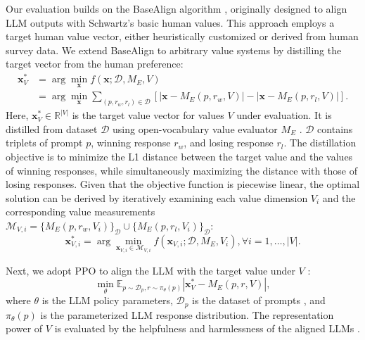 Our evaluation builds on the BaseAlign algorithm \cite{yao2023value_fulcra}, originally designed to align LLM outputs with Schwartz's basic human values. This approach employs a target human value vector, either heuristically customized or derived from human survey data. We extend BaseAlign to arbitrary value systems by distilling the target vector from the human preference:
\begin{equation}
  \begin{aligned}
  \mathbf{x}_{V}^{*} & = \arg\min_{\mathbf{x}} f(\mathbf{x}; \mathcal{D}, M_E, V) \\
  & = \arg\min_{\mathbf{x}} \sum_{(p, r_w, r_l) \in \mathcal{D}} \left[\left| \mathbf{x} - M_E(p, r_w, V)\right| - \left| \mathbf{x} - M_E(p, r_l, V ) \right| \right].
  \end{aligned}
\end{equation}
Here, $\mathbf{x}_{V}^{*} \in \mathbb{R}^{|V|}$ is the target value vector for values $V$ under evaluation. It is distilled from dataset $\mathcal{D}$ \cite{ouyang2022training} using open-vocabulary value evaluator $M_E$ \cite{ye2025gpv}. $\mathcal{D}$ contains triplets of prompt $p$, winning response $r_w$, and losing response $r_l$. 
The distillation objective is to minimize the L1 distance between the target value and the values of winning responses, while simultaneously maximizing the distance with those of losing responses. Given that the objective function is piecewise linear, the optimal solution can be derived by iteratively examining each value dimension \( V_i \) and the corresponding value measurements \( \mathcal{M}_{V, i} = \{M_E(p, r_w, V_i)\}_\mathcal{D} \cup \{M_E(p, r_l, V_i)\}_\mathcal{D} \):
\begin{equation}
  \mathbf{x}_{V, i}^{*} = \arg\min_{\mathbf{x}_{V, i} \in \mathcal{M}_{V, i}} f(\mathbf{x}_{V, i}; \mathcal{D}, M_E, V_i), 
  \forall i = 1, \ldots, |V|.
\end{equation}

Next, we adopt PPO \cite{schulman2017proximal} to align the LLM with the target value under \( V \) \cite{yao2023value_fulcra}:
\begin{equation}
  \min_{\theta} \mathbb{E}_{p \sim \mathcal{D}_p, r \sim \pi_{\theta}(p)}
  \left|   
  \mathbf{x}_{V}^{*} - M_E(p, r, V)
  \right|,
\end{equation}
where \( \theta \) is the LLM policy parameters, \( \mathcal{D}_p \) is the dataset of prompts \cite{dai2023safe}, and \( \pi_{\theta}(p) \) is the parameterized LLM response distribution.
The representation power of \( V \) is evaluated by the helpfulness and harmlessness of the aligned LLMs \cite{bai2022training, yao2023value_fulcra}.